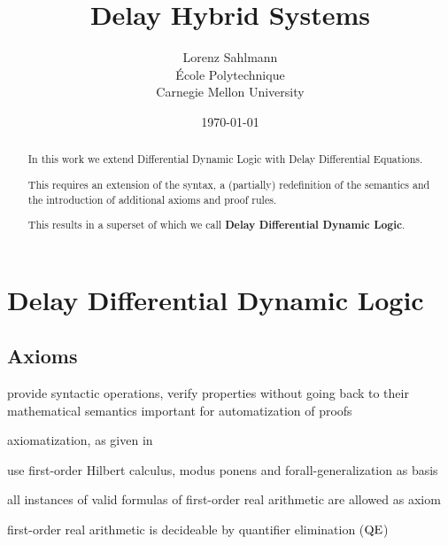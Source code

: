 \documentclass[10pt]{report}
\begin{document}
\title{Delay Hybrid Systems}

\author{Lorenz Sahlmann\\ École Polytechnique\\ Carnegie Mellon University}
\date{\today}

\maketitle

\begin{abstract}
    In this work we extend Differential Dynamic Logic with Delay Differential Equations.

    This requires an extension of the syntax, a (partially) redefinition of the semantics and the introduction of additional axioms and proof rules.

    This results in a superset of \dL which we call \textbf{Delay Differential Dynamic Logic}.
\end{abstract}

%



%



%
\chapter{Delay Differential Dynamic Logic}
\label{sec:delay-differential-dynamic-logic}

\section{Axioms}
    \label{sec:axioms}

    provide syntactic operations, verify properties without going back to their mathematical semantics
    important for automatization of proofs

    \dL axiomatization, as given in \cite{Platzer12Complete}

    use first-order Hilbert calculus, modus ponens and forall-generalization as basis

    all instances of valid formulas of first-order real arithmetic are allowed as axiom

    first-order real arithmetic is decideable by quantifier elimination ($\operatorname{QE}$)
\end{document}
